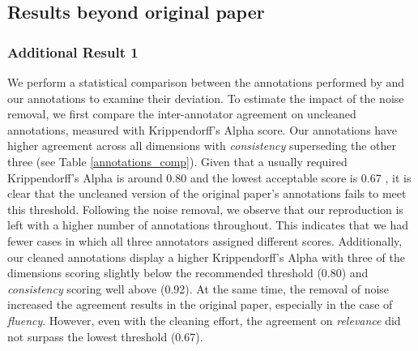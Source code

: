 \subsection{Results beyond original paper}
\label{sec:results_beyond1}
\subsubsection{Additional Result 1} \label{add1}
We perform a statistical comparison between the annotations performed by \citet{gao2022dialsummeval} and our annotations to examine their deviation. To estimate the impact of the noise removal, we first compare the inter-annotator agreement on uncleaned annotations, measured with Krippendorff's Alpha score. Our annotations have higher agreement across all dimensions with \textit{consistency} superseding the other three (see Table \ref{annotations_comp}). Given that a usually required Krippendorff's Alpha is around 0.80 and the lowest acceptable score is 0.67 \cite{krippendorff2004content}, it is clear that the uncleaned version of the original paper's annotations fails to meet this threshold. 
Following the noise removal, we observe that our reproduction is left with a higher number of annotations throughout. This indicates that we had fewer cases in which all three annotators assigned different scores. Additionally, our cleaned annotations display a higher Krippendorff's Alpha with three of the dimensions scoring slightly below the recommended threshold (0.80)  and \textit{consistency} scoring well above (0.92). At the same time, the removal of noise increased the agreement results in the original paper, especially in the case of \textit{fluency}. However, even with the cleaning effort, the agreement on \textit{relevance} did not surpass the lowest threshold (0.67).

